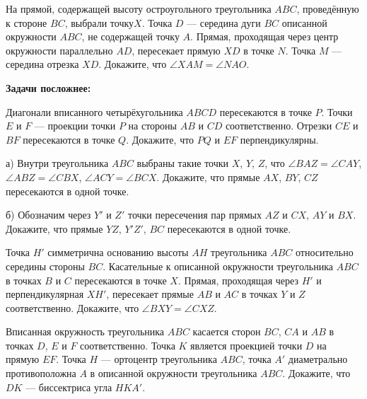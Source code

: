 \documentclass{article}
\begin{document}
\begin{enumerate_boxed}
        \item На прямой, содержащей высоту остроугольного треугольника \(ABC\), проведённую к стороне \(BC\), выбрали точку\(X\).
        Точка \(D\) — середина дуги \(BC\) описанной окружности \(ABC\), не содержащей точку \(A\).
        Прямая, проходящая через центр окружности параллельно \(AD\), пересекает прямую \(XD\) в точке \(N\).
        Точка \(M\) — середина отрезка \(XD\).
        Докажите, что \(\angle XAM = \angle NAO\).

        \textbf{Задачи посложнее:}

        \item Диагонали вписанного четырёхугольника \(ABCD\) пересекаются в точке \(P\).
        Точки \(E\) и \(F\) — проекции точки \(P\) на стороны \(AB\) и \(CD\) соответственно.
        Отрезки \(CE\) и \(BF\) пересекаются в точке \(Q\).
        Докажите, что \(PQ\) и \(EF\) перпендикулярны.

        \item а) Внутри треугольника \(ABC\) выбраны такие точки \(X\), \(Y\), \(Z\), что
        \(\angle BAZ = \angle CAY\), \(\angle ABZ = \angle CBX\), \(\angle ACY = \angle BCX\).
        Докажите, что прямые \(AX\), \(BY\), \(CZ\) пересекаются в одной точке.

        б) Обозначим через \(Y'\) и \(Z'\) точки пересечения пар прямых \(AZ\) и \(CX\), \(AY\) и \(BX\).
        Докажите, что прямые \(YZ\), \(Y'Z'\), \(BC\) пересекаются в одной точке.

        \item Точка \(H'\) симметрична основанию высоты \(AH\) треугольника \(ABC\) относительно середины стороны \(BC\).
        Касательные к описанной окружности треугольника \(ABC\) в точках \(B\) и \(C\) пересекаются в точке \(X\).
        Прямая, проходящая через \(H'\) и перпендикулярная \(XH'\), пересекает прямые \(AB\) и \(AC\) в точках \(Y\) и \(Z\) соответственно.
        Докажите, что \(\angle BXY = \angle CXZ\).

        \item Вписанная окружность треугольника \(ABC\) касается сторон \(BC\), \(CA\) и \(AB\) в точках \(D\), \(E\) и \(F\) соответственно.
        Точка \(K\) является проекцией точки \(D\) на прямую \(EF\).
        Точка \(H\) — ортоцентр треугольника \(ABC\), точка \(A'\) диаметрально противоположна \(A\) в описанной окружности треугольника \(ABC\).
        Докажите, что \(DK\) — биссектриса угла \(HKA'\).

    \end{enumerate_boxed}
\end{document}
